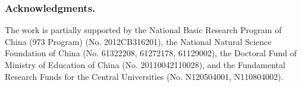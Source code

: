\subsubsection*{Acknowledgments.}
{The work is partially supported by the National Basic Research Program of China (973 Program) (No. 2012CB316201), the National Natural Science Foundation of China (No. 61322208, 61272178, 61129002), the Doctoral Fund of Ministry of Education of China (No. 20110042110028), and the Fundamental Research Funds for the Central Universities (No. N120504001, N110804002).}


